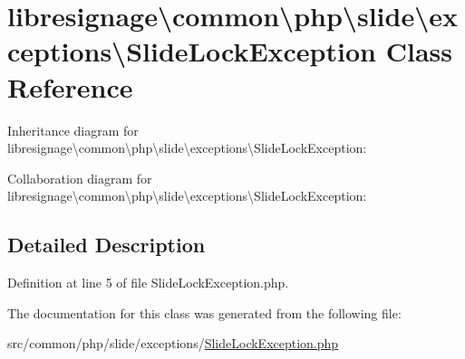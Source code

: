 \hypertarget{classlibresignage_1_1common_1_1php_1_1slide_1_1exceptions_1_1SlideLockException}{}\section{libresignage\textbackslash{}common\textbackslash{}php\textbackslash{}slide\textbackslash{}exceptions\textbackslash{}Slide\+Lock\+Exception Class Reference}
\label{classlibresignage_1_1common_1_1php_1_1slide_1_1exceptions_1_1SlideLockException}


Inheritance diagram for libresignage\textbackslash{}common\textbackslash{}php\textbackslash{}slide\textbackslash{}exceptions\textbackslash{}Slide\+Lock\+Exception\+:


Collaboration diagram for libresignage\textbackslash{}common\textbackslash{}php\textbackslash{}slide\textbackslash{}exceptions\textbackslash{}Slide\+Lock\+Exception\+:


\subsection{Detailed Description}


Definition at line 5 of file Slide\+Lock\+Exception.\+php.



The documentation for this class was generated from the following file\+:\begin{DoxyCompactItemize}
\item 
src/common/php/slide/exceptions/\hyperlink{SlideLockException_8php}{Slide\+Lock\+Exception.\+php}\end{DoxyCompactItemize}

